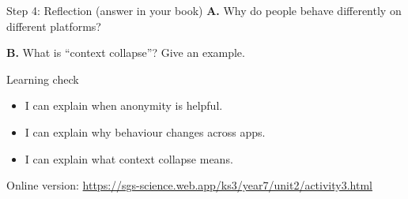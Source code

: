 \documentclass[10pt,a4paper]{article}
\begin{document}
\begin{StepBox}{Step 4: Reflection (answer in your book)}
\textbf{A.} Why do people behave differently on different platforms?\par
\textbf{B.} What is ``context collapse''? Give an example.
\end{StepBox}

\begin{InfoBox}{Learning check}
\begin{itemize}[leftmargin=*,label=$\square$,nosep]
  \item I can explain when anonymity is helpful.
  \item I can explain why behaviour changes across apps.
  \item I can explain what context collapse means.
\end{itemize}
\end{InfoBox}

{\small\color{sgsGrey}Online version: \url{https://sgs-science.web.app/ks3/year7/unit2/activity3.html}}
\end{document}
